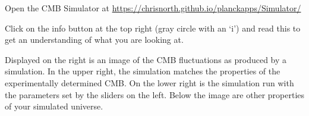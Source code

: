 \begin{steps}

\item Open the CMB Simulator at \url{https://chrisnorth.github.io/planckapps/Simulator/}

\item Click on the info button at the top right (gray circle with an `i') and read this to get an understanding of what you are looking at.

\end{steps}

Displayed on the right is an image of the CMB fluctuations as produced by a simulation. In the upper right, the simulation matches the properties of the experimentally determined CMB. On the lower right is the simulation run with the parameters set by the sliders on the left. Below the image are other properties of your simulated universe.

